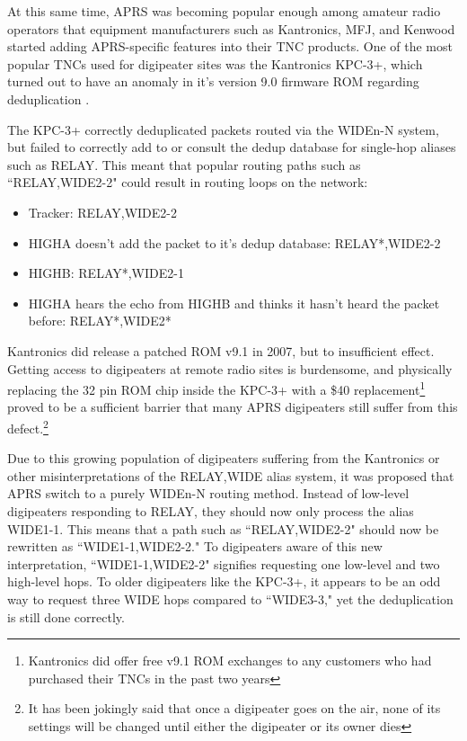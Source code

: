At this same time, APRS was becoming popular enough among amateur radio operators that
equipment manufacturers such as Kantronics, MFJ, and Kenwood started adding APRS-specific features
into their TNC products.
One of the most popular TNCs used for digipeater sites was the Kantronics KPC-3+,
which turned out to have an anomaly in it's 
version 9.0 firmware ROM regarding deduplication \cite{kpc3bugbulletin}.

The KPC-3+ correctly deduplicated packets routed via the WIDEn-N system,
but failed to correctly add to or consult the dedup database for single-hop
aliases such as RELAY.
This meant that popular routing paths such as ``RELAY,WIDE2-2" could result in
routing loops on the network:

\begin{itemize}
	\item Tracker: RELAY,WIDE2-2
	\item HIGHA doesn't add the packet to it's dedup database: RELAY*,WIDE2-2 
	\item HIGHB: RELAY*,WIDE2-1
	\item HIGHA hears the echo from HIGHB and thinks it hasn't heard the packet before: RELAY*,WIDE2*
\end{itemize}

Kantronics did release a patched ROM v9.1 in 2007, but to insufficient effect.
Getting access to digipeaters at remote radio sites is burdensome,
and physically replacing the 32 pin ROM chip inside the KPC-3+ 
with a \$40 replacement\footnote{Kantronics did offer free v9.1 ROM exchanges to 
any customers who had purchased their TNCs in the past two years} 
proved to be a sufficient barrier that many APRS digipeaters still
suffer from this defect.\footnote{It has been jokingly said that once a digipeater
	goes on the air, none of its settings will be changed until either the digipeater
or its owner dies}

Due to this growing population of digipeaters suffering from the Kantronics or other
misinterpretations of the RELAY,WIDE alias system, 
it was proposed that APRS switch to a purely WIDEn-N routing method. 
Instead of low-level digipeaters responding to RELAY,
they should now only process the alias WIDE1-1.
This means that a path such as ``RELAY,WIDE2-2" should now be rewritten as
``WIDE1-1,WIDE2-2." 
To digipeaters aware of this new interpretation, ``WIDE1-1,WIDE2-2" signifies 
requesting one low-level and two high-level hops.
To older digipeaters like the KPC-3+, it appears to be an odd way to request
three WIDE hops compared to ``WIDE3-3," 
yet the deduplication is still done correctly.

